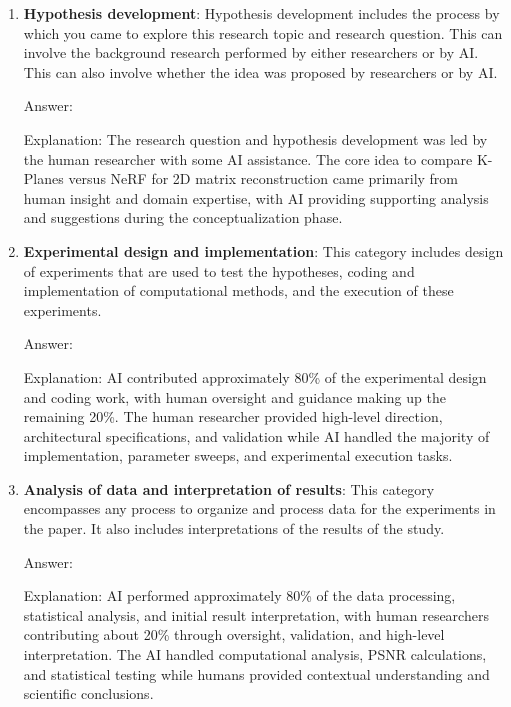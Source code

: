 \documentclass{article}
\begin{document}
\begin{enumerate}
    \item \textbf{Hypothesis development}: Hypothesis development includes the process by which you came to explore this research topic and research question. This can involve the background research performed by either researchers or by AI. This can also involve whether the idea was proposed by researchers or by AI. 

    Answer: \involvementB{} %
    
    Explanation: The research question and hypothesis development was led by the human researcher with some AI assistance. The core idea to compare K-Planes versus NeRF for 2D matrix reconstruction came primarily from human insight and domain expertise, with AI providing supporting analysis and suggestions during the conceptualization phase.

    \item \textbf{Experimental design and implementation}: This category includes design of experiments that are used to test the hypotheses, coding and implementation of computational methods, and the execution of these experiments. 

    Answer: \involvementC{} %
    
    Explanation: AI contributed approximately 80\% of the experimental design and coding work, with human oversight and guidance making up the remaining 20\%. The human researcher provided high-level direction, architectural specifications, and validation while AI handled the majority of implementation, parameter sweeps, and experimental execution tasks.

    \item \textbf{Analysis of data and interpretation of results}: This category encompasses any process to organize and process data for the experiments in the paper. It also includes interpretations of the results of the study.

    Answer: \involvementC{} %
    
    Explanation: AI performed approximately 80\% of the data processing, statistical analysis, and initial result interpretation, with human researchers contributing about 20\% through oversight, validation, and high-level interpretation. The AI handled computational analysis, PSNR calculations, and statistical testing while humans provided contextual understanding and scientific conclusions.


\end{enumerate}
\end{document}
